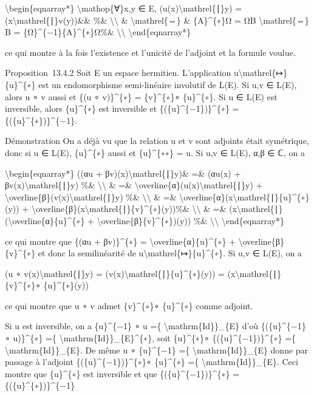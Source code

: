 \documentclass[]{article}
\begin{document}
\textbackslash{}begin\{eqnarray*\} \textbackslash{}mathop\{∀\}x,y ∈ E,
(u(x)\textbackslash{}mathrel\{∣\}y) =
(x\textbackslash{}mathrel\{∣\}v(y))\&\& \%\&
\textbackslash{}\textbackslash{} \& \textbackslash{}mathrel\{⇔\} \&
\{A\}\^{}\{∗\}Ω = ΩB \textbackslash{}mathrel\{⇔\} B =
\{Ω\}\^{}\{−1\}\{A\}\^{}\{∗\}Ω\%\& \textbackslash{}\textbackslash{}
\textbackslash{}end\{eqnarray*\}

ce qui montre à la fois l'existence et l'unicité de l'adjoint et la
formule voulue.

Proposition~13.4.2 Soit E un espace hermitien. L'application
u\textbackslash{}mathrel\{↦\}\{u\}\^{}\{∗\} est un endomorphisme
semi-linéaire involutif de L(E). Si u,v ∈ L(E), alors u ∘ v aussi et
\{(u ∘ v)\}\^{}\{∗\} = \{v\}\^{}\{∗\}∘ \{u\}\^{}\{∗\}. Si u ∈ L(E) est
inversible, alors \{u\}\^{}\{∗\} est inversible et
\{(\{u\}\^{}\{−1\})\}\^{}\{∗\} = \{(\{u\}\^{}\{∗\})\}\^{}\{−1\}.

Démonstration On a déjà vu que la relation u et v sont adjoints était
symétrique, donc si u ∈ L(E), \{u\}\^{}\{∗\} aussi et \{u\}\^{}\{∗∗\} =
u. Si u,v ∈ L(E), α,β ∈ ℂ, on a

\textbackslash{}begin\{eqnarray*\} ((αu +
βv)(x)\textbackslash{}mathrel\{∣\}y)\& =\& (αu(x) +
βv(x)\textbackslash{}mathrel\{∣\}y) \%\&
\textbackslash{}\textbackslash{} \& =\&
\textbackslash{}overline\{α\}(u(x)\textbackslash{}mathrel\{∣\}y) +
\textbackslash{}overline\{β\}(v(x)\textbackslash{}mathrel\{∣\}y) \%\&
\textbackslash{}\textbackslash{} \& =\&
\textbackslash{}overline\{α\}(x\textbackslash{}mathrel\{∣\}\{u\}\^{}\{∗\}(y))
+
\textbackslash{}overline\{β\}(x\textbackslash{}mathrel\{∣\}\{v\}\^{}\{∗\}(y))\%\&
\textbackslash{}\textbackslash{} \& =\&
(x\textbackslash{}mathrel\{∣\}(\textbackslash{}overline\{α\}\{u\}\^{}\{∗\}
+ \textbackslash{}overline\{β\}\{v\}\^{}\{∗\})(y)) \%\&
\textbackslash{}\textbackslash{} \textbackslash{}end\{eqnarray*\}

ce qui montre que \{(αu + βv)\}\^{}\{∗\} =
\textbackslash{}overline\{α\}\{u\}\^{}\{∗\} +
\textbackslash{}overline\{β\}\{v\}\^{}\{∗\} et donc la semilinéarité de
u\textbackslash{}mathrel\{↦\}\{u\}\^{}\{∗\}. Si u,v ∈ L(E), on a

(u ∘ v(x)\textbackslash{}mathrel\{∣\}y) =
(v(x)\textbackslash{}mathrel\{∣\}\{u\}\^{}\{∗\}(y)) =
(x\textbackslash{}mathrel\{∣\}\{v\}\^{}\{∗\}∘ \{u\}\^{}\{∗\}(y))

ce qui montre que u ∘ v admet \{v\}\^{}\{∗\}∘ \{u\}\^{}\{∗\} comme
adjoint.

Si u est inversible, on a \{u\}\^{}\{−1\} ∘ u =\{
\textbackslash{}mathrm\{Id\}\}\_\{E\} d'où \{(\{u\}\^{}\{−1\} ∘
u)\}\^{}\{∗\} =\{ \textbackslash{}mathrm\{Id\}\}\_\{E\}\^{}\{∗\}, soit
\{u\}\^{}\{∗\}∘ \{(\{u\}\^{}\{−1\})\}\^{}\{∗\} =\{
\textbackslash{}mathrm\{Id\}\}\_\{E\}. De même u ∘ \{u\}\^{}\{−1\} =\{
\textbackslash{}mathrm\{Id\}\}\_\{E\} donne par passage à l'adjoint
\{(\{u\}\^{}\{−1\})\}\^{}\{∗\}∘ \{u\}\^{}\{∗\} =\{
\textbackslash{}mathrm\{Id\}\}\_\{E\}. Ceci montre que \{u\}\^{}\{∗\}
est inversible et que \{(\{u\}\^{}\{−1\})\}\^{}\{∗\} =
\{(\{u\}\^{}\{∗\})\}\^{}\{−1\}
\end{document}
